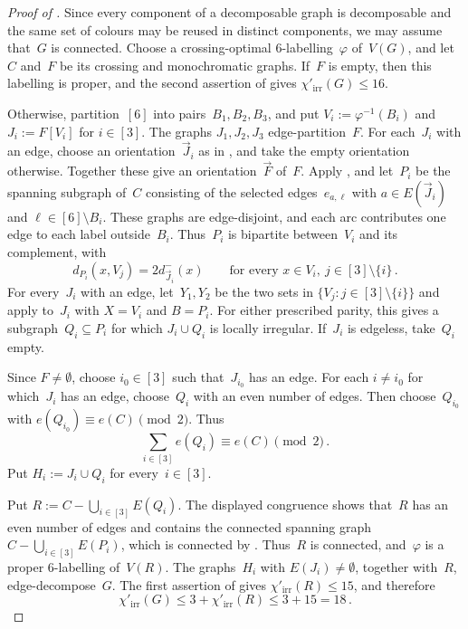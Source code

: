 \documentclass[12pt,reqno,a4paper]{amsart}
\newcommand{\lir}{\chi'_{\mathrm{irr}}}
\begin{document}
\begin{proof}[Proof of ]
  Since every component of a decomposable graph is decomposable and the same
  set of colours may be reused in distinct components, we may assume that~$G$
  is connected. 
  Choose a crossing-optimal $6$-labelling~$\varphi$ of~$V(G)$, and let~$C$
  and~$F$ be its crossing and monochromatic graphs. 
  If~$F$ is empty, then this labelling is proper, and the second assertion of
   gives $\lir(G)\le16$.

  Otherwise, partition~$[6]$ into pairs~$B_1,B_2,B_3$, and put
  $V_i := \varphi^{-1}(B_i)$ and $J_i := F[V_i]$ for $i \in [3]$.
  The graphs $J_1,J_2,J_3$ edge-partition~$F$.
  For each~$J_i$ with an edge, choose an orientation~$\vec J_i$ as in
  , and take the empty orientation otherwise.
  Together these give an orientation~$\vec F$ of~$F$.
  Apply , and let~$P_i$ be the spanning subgraph of~$C$
  consisting of the selected edges~$e_{a,\ell}$ with $a \in E(\vec J_i)$ and
  $\ell \in [6] \setminus B_i$.
  These graphs are edge-disjoint, and each arc contributes one edge to each
  label outside~$B_i$.
  Thus~$P_i$ is bipartite between~$V_i$ and its complement, with
  \[
    d_{P_i}(x,V_j) = 2d^-_{\vec J_i}(x)
      \qquad \text{for every } x \in V_i,\ j \in [3] \setminus \{i\} \,.
  \]
  For every~$J_i$ with an edge, let~$Y_1,Y_2$ be the two sets in
  $\{V_j \colon j \in [3] \setminus \{i\}\}$ and apply 
  to~$J_i$ with $X = V_i$ and $B = P_i$. 
  For either prescribed parity, this gives a subgraph~$Q_i \subseteq P_i$ for
  which $J_i \cup Q_i$ is locally irregular. 
  If~$J_i$ is edgeless, take~$Q_i$ empty.

  Since $F \neq \emptyset$, choose $i_0 \in [3]$ such that~$J_{i_0}$ has an edge.
  For each $i \neq i_0$ for which~$J_i$ has an edge, choose~$Q_i$ with an even
  number of edges. 
  Then choose~$Q_{i_0}$ with $e(Q_{i_0}) \equiv e(C) \pmod 2$. 
  Thus
  \[
    \sum_{i \in [3]} e(Q_i) \equiv e(C) \pmod 2 \,.
  \]
  Put $H_i := J_i \cup Q_i$ for every~$i \in [3]$.

  Put $R := C - \bigcup_{i \in [3]} E(Q_i)$. 
  The displayed congruence shows that~$R$ has an even number of edges and
  contains the connected spanning graph $C-\bigcup_{i \in [3]} E(P_i)$, which
  is connected by .
  Thus~$R$ is connected, and~$\varphi$ is a proper $6$-labelling of~$V(R)$.
  The graphs~$H_i$ with $E(J_i) \neq \emptyset$, together with~$R$,
  edge-decompose~$G$. 
  The first assertion of  gives $\lir(R) \le 15$, and
  therefore
  \[
    \lir(G) \le 3 + \lir(R) \le 3 + 15 = 18 \, .
  \]
\end{proof}
\end{document}
